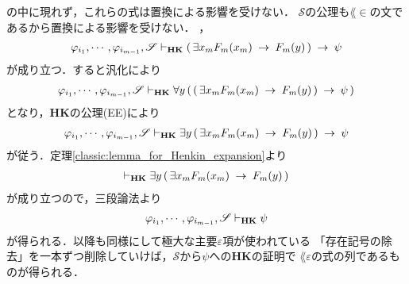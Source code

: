 \begin{sketch}
{			の中に現れず，これらの式は置換による影響を受けない．
			$\mathscr{S}$の公理も$\lang{\in}$の文であるから置換による影響を受けない．
		}，
		\begin{align}
			\varphi_{i_{1}},\cdots,\varphi_{i_{m-1}},\mathscr{S} 
			\vdash_{{\scriptsize \mbox{{\bf HK}}}} 
			(\, \exists x_{m} F_{m}(x_{m}) \hspace{0.25em}\rightarrow\hspace{0.25em} F_{m}(y)\, ) \hspace{0.25em}\rightarrow\hspace{0.25em} \psi
		\end{align}
		が成り立つ．すると汎化により
		\begin{align}
			\varphi_{i_{1}},\cdots,\varphi_{i_{m-1}},\mathscr{S} 
			\vdash_{{\scriptsize \mbox{{\bf HK}}}} 
			\forall y\, (\, (\, \exists x_{m} F_{m}(x_{m}) \hspace{0.25em}\rightarrow\hspace{0.25em} F_{m}(y)\, ) \hspace{0.25em}\rightarrow\hspace{0.25em} \psi\, )
		\end{align}
		となり，{\bf HK}の公理(EE)により
		\begin{align}
			\varphi_{i_{1}},\cdots,\varphi_{i_{m-1}},\mathscr{S} 
			\vdash_{{\scriptsize \mbox{{\bf HK}}}} 
			\exists y\, (\, \exists x_{m} F_{m}(x_{m}) \hspace{0.25em}\rightarrow\hspace{0.25em} F_{m}(y)\, ) \hspace{0.25em}\rightarrow\hspace{0.25em} \psi
		\end{align}
		が従う．定理\ref{classic:lemma_for_Henkin_expansion}より
		\begin{align}
			\vdash_{{\scriptsize \mbox{{\bf HK}}}} 
			\exists y\, (\, \exists x_{m} F_{m}(x_{m}) \hspace{0.25em}\rightarrow\hspace{0.25em} F_{m}(y)\, )
		\end{align}
		が成り立つので，三段論法より
		\begin{align}
			\varphi_{i_{1}},\cdots,\varphi_{i_{m-1}},\mathscr{S} 
			\vdash_{{\scriptsize \mbox{{\bf HK}}}} \psi
		\end{align}
		が得られる．以降も同様にして極大な主要$\varepsilon$項が使われている
		「存在記号の除去」を一本ずつ削除していけば，$\mathscr{S}$から$\psi$への{\bf HK}の証明で
		$\lang{\varepsilon}$の式の列であるものが得られる．
		\QED
	\end{sketch}
	
